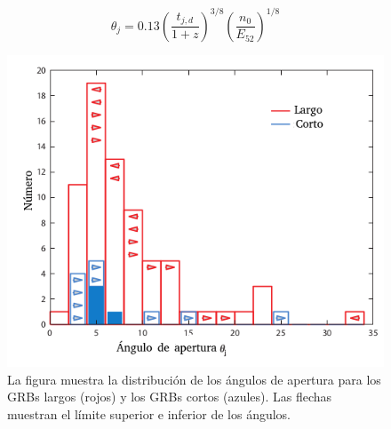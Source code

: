 \documentclass[12pt,a4paper]{book}
\begin{document}
%
%
%
\begin{equation}
\theta_j = 0.13 \left( \frac{t_{j,d}}{1+z} \right)^{3/8}
\left(\frac{n_0}{E_{52}} \right)^{1/8}
\end{equation}
%
%

\begin{figure}
\centering
\includegraphics[scale=0.7]{./Figuras/Distribucion_angulo_apertura}
\caption{La figura muestra la distribución de los ángulos de apertura para los GRBs largos (rojos) y los GRBs cortos (azules). Las flechas muestran el límite superior e inferior de los ángulos. }
\end{figure}
\end{document}
